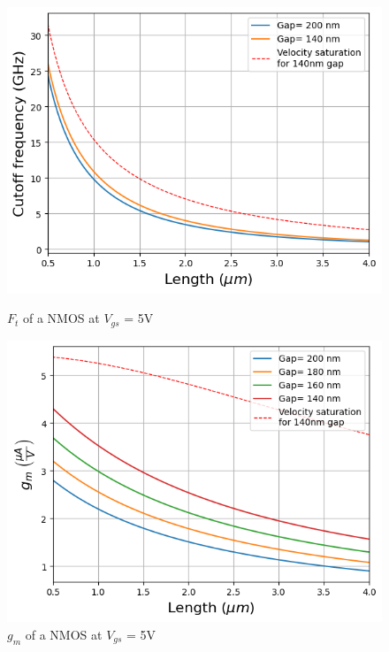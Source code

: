 \begin{figure}[h]
    \begin{minipage}{0.24\textwidth}
        \centering
        \includegraphics[width=\linewidth]{ft1.png}
        \caption{$F_t$ of a NMOS at $V_{gs}$ = 5V}
        \label{fig:ft}
        
    \end{minipage}%
    \hspace{0.1pt}
    \begin{minipage}{0.24
        \textwidth}
        \centering
        \includegraphics[width=\linewidth]{gm.png}
        \caption{$g_m$ of a NMOS at $V_{gs}$ = 5V}
        \label{fig:gm}
    \end{minipage}
\end{figure}





